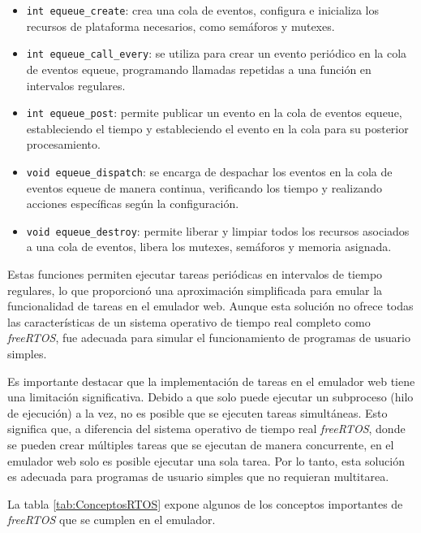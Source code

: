  
 \begin{itemize}
	\item \texttt{int equeue\_create}:  crea una cola de eventos, configura e inicializa los recursos de plataforma necesarios, como semáforos y mutexes.
	
	\item \texttt{int equeue\_call\_every}:  se utiliza para crear un evento periódico en la cola de eventos equeue, programando llamadas repetidas a una función en intervalos regulares.
	
	\item \texttt{int equeue\_post}: permite publicar un evento en la cola de eventos equeue, estableciendo el tiempo y estableciendo el evento en la cola para su posterior procesamiento.
	
	\item \texttt{void equeue\_dispatch}: se encarga de despachar los eventos en la cola de eventos equeue de manera continua, verificando los tiempo y realizando acciones específicas según la configuración.

	\item \texttt{void equeue\_destroy}: permite liberar y limpiar todos los recursos asociados a una cola de eventos, libera los mutexes, semáforos y memoria asignada.
\end{itemize}

Estas funciones permiten ejecutar tareas periódicas en intervalos de tiempo regulares, lo que proporcionó una aproximación simplificada para emular la funcionalidad de tareas en el emulador web. Aunque esta solución no ofrece todas las características de un sistema operativo de tiempo real completo como \textit{freeRTOS}, fue adecuada para simular el funcionamiento de programas de usuario simples.

Es importante destacar que la implementación de tareas en el emulador web tiene una limitación significativa. Debido a que solo puede ejecutar un subproceso (hilo de ejecución) a la vez, no es posible que se ejecuten tareas simultáneas. Esto significa que, a diferencia del sistema operativo de tiempo real \textit{freeRTOS}, donde se pueden crear múltiples tareas que se ejecutan de manera concurrente, en el emulador web solo es posible ejecutar una sola tarea. Por lo tanto, esta solución es adecuada para programas de usuario simples que no requieran multitarea.


La tabla \ref{tab:ConceptosRTOS} expone algunos de los conceptos importantes de \textit{freeRTOS} que se cumplen en el emulador.

